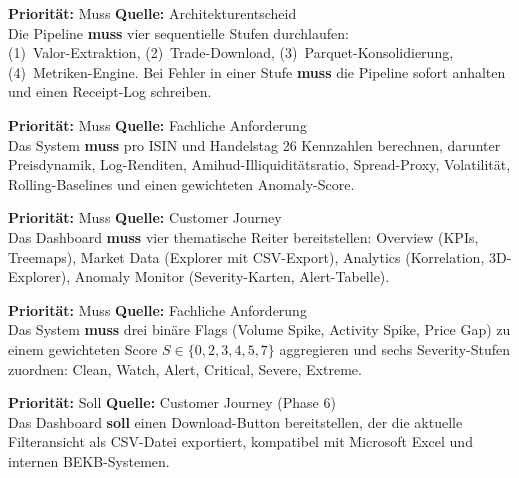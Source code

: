 \documentclass[12pt, a4paper, oneside]{report}
\begin{document}
\begin{reqbox}
\textbf{Priorität:} Muss \quad \textbf{Quelle:} Architekturentscheid \\
Die Pipeline \textbf{muss} vier sequentielle Stufen durchlaufen: \\
(1)~Valor-Extraktion, (2)~Trade-Download, (3)~Parquet-Konsolidierung, (4)~Metriken-Engine. Bei Fehler in einer Stufe \textbf{muss} die Pipeline sofort anhalten und einen Receipt-Log schreiben.
\end{reqbox}

\begin{reqbox}
\textbf{Priorität:} Muss \quad \textbf{Quelle:} Fachliche Anforderung \\
Das System \textbf{muss} pro ISIN und Handelstag 26 Kennzahlen berechnen, darunter Preisdynamik, Log-Renditen, Amihud-Illiquiditätsratio, Spread-Proxy, Volatilität, Rolling-Baselines und einen gewichteten Anomaly-Score.
\end{reqbox}

\begin{reqbox}
\textbf{Priorität:} Muss \quad \textbf{Quelle:} Customer Journey \\
Das Dashboard \textbf{muss} vier thematische Reiter bereitstellen: Overview (KPIs, Treemaps), Market Data (Explorer mit CSV-Export), Analytics (Korrelation, 3D-Explorer), Anomaly Monitor (Severity-Karten, Alert-Tabelle).
\end{reqbox}

\begin{reqbox}
\textbf{Priorität:} Muss \quad \textbf{Quelle:} Fachliche Anforderung \\
Das System \textbf{muss} drei binäre Flags (Volume Spike, Activity Spike, Price Gap) zu einem gewichteten Score $S \in \{0,2,3,4,5,7\}$ aggregieren und sechs Severity-Stufen zuordnen: Clean, Watch, Alert, Critical, Severe, Extreme.
\end{reqbox}

\begin{reqbox}
\textbf{Priorität:} Soll \quad \textbf{Quelle:} Customer Journey (Phase 6) \\
Das Dashboard \textbf{soll} einen Download-Button bereitstellen, der die aktuelle Filteransicht als CSV-Datei exportiert, kompatibel mit Microsoft Excel und internen BEKB-Systemen.
\end{reqbox}
\end{document}
